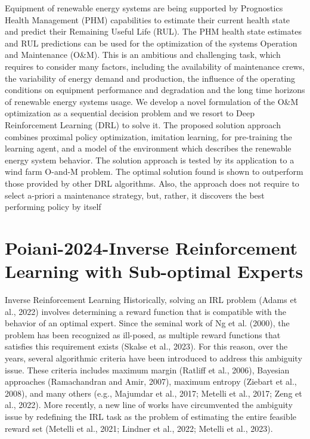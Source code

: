 \documentclass{article}
\begin{document}
Equipment of renewable energy systems are being supported by Prognostics  Health Management (PHM) capabilities to estimate their current health state and predict their Remaining Useful Life (RUL). The PHM health state estimates and RUL predictions can be used for the optimization of the systems Operation and Maintenance (O&M). This is an ambitious and challenging task, which requires to consider many factors, including the availability of maintenance crews, the variability of energy demand and production, the influence of the operating conditions on equipment performance and degradation and the long time horizons of renewable energy systems usage. We develop a novel formulation of the O&M optimization as a sequential decision problem and we resort to Deep Reinforcement Learning (DRL) to solve it. The proposed solution approach combines proximal policy optimization, imitation learning, for pre-training the learning agent, and a model of the environment which describes the renewable energy system behavior. The solution approach is tested by its application to a wind farm O-and-M problem. The optimal solution found is shown to outperform those provided by other DRL algorithms. Also, the approach does not require to select a-priori a maintenance strategy, but, rather, it discovers the best performing policy by itself



\section{Poiani-2024-Inverse Reinforcement Learning with Sub-optimal Experts}

Inverse Reinforcement Learning Historically,
solving an IRL problem (Adams et al., 2022) involves
determining a reward function that is compatible with
the behavior of an optimal expert. Since the seminal
work of Ng et al. (2000), the problem has been recognized
as ill-posed, as multiple reward functions that
satisfies this requirement exists (Skalse et al., 2023).
For this reason, over the years, several algorithmic
criteria have been introduced to address this ambiguity
issue. These criteria includes maximum margin
(Ratliff et al., 2006), Bayesian approaches (Ramachandran
and Amir, 2007), maximum entropy (Ziebart
et al., 2008), and many others (e.g., Majumdar et al.,
2017; Metelli et al., 2017; Zeng et al., 2022). More
recently, a new line of works have circumvented the
ambiguity issue by redefining the IRL task as the problem
of estimating the entire feasible reward set (Metelli
et al., 2021; Lindner et al., 2022; Metelli et al., 2023).
\end{document}
